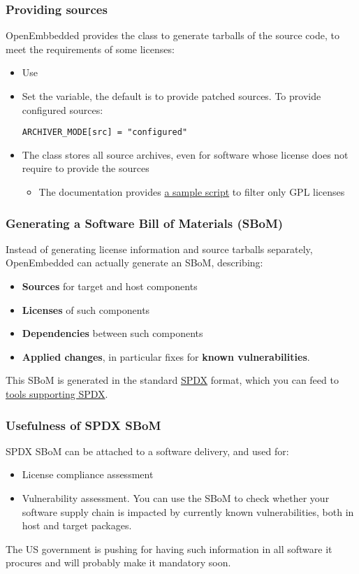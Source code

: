\begin{frame}[fragile]
  \frametitle{Providing sources}
  OpenEmbbedded provides the  class to generate
  tarballs of the source code, to meet the requirements of some licenses:
  \begin{itemize}
  \item Use 
  \item Set the  variable, the default is to
    provide patched sources. To provide configured sources:
    \begin{block}{}
      \fontsize{9}{9}\selectfont
      \begin{verbatim}
ARCHIVER_MODE[src] = "configured"
      \end{verbatim}
    \end{block}
  \item The  class stores all source archives, even for
    software whose license does not require to provide the sources
    \begin{itemize}
    \item The documentation provides
      \href{https://docs.yoctoproject.org/dev-manual/licenses.html#providing-the-source-code}{a sample script}
      to filter only GPL licenses
    \end{itemize}
  \end{itemize}
\end{frame}

\begin{frame}
  \frametitle{Generating a Software Bill of Materials (SBoM)}
  Instead of generating license information and source tarballs separately,
  OpenEmbedded can actually generate an SBoM, describing:
  \begin{itemize}
    \item {\bf Sources} for target and host components
    \item {\bf Licenses} of such components
    \item {\bf Dependencies} between such components
    \item {\bf Applied changes}, in particular fixes for {\bf known vulnerabilities}.
  \end{itemize}
  This SBoM is generated in the standard \href{https://spdx.dev/}{SPDX} format,
  which you can feed to \href{https://spdx.dev/resources/tools/}{tools supporting SPDX}.
\end{frame}

\begin{frame}
  \frametitle{Usefulness of SPDX SBoM}
  SPDX SBoM can be attached to a software delivery, and used for:
  \begin{itemize}
     \item License compliance assessment
     \item Vulnerability assessment. You can use the SBoM to check
	   whether your software supply chain is impacted by currently known
	   vulnerabilities, both in host and target packages.
  \end{itemize}
  The US government is pushing for having such information
  in all software it procures and will probably make it mandatory soon.
\end{frame}

